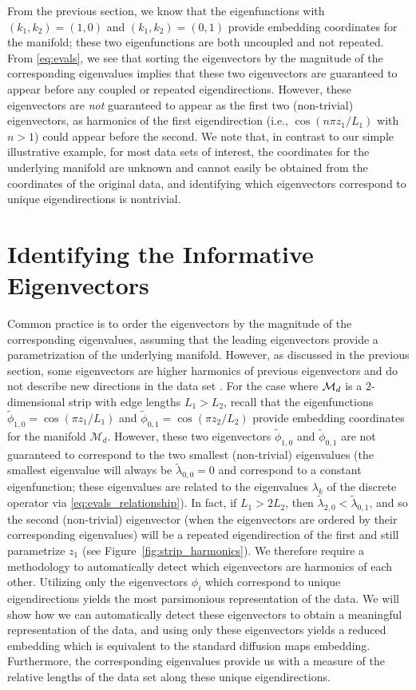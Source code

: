 From the previous section, we know that the eigenfunctions with $(k_1, k_2) =(1, 0)$ and $(k_1, k_2) =(0, 1)$ provide embedding coordinates for the manifold; these two eigenfunctions are both uncoupled and not repeated.
%
From \eqref{eq:evals}, we see that sorting the eigenvectors by the magnitude of the corresponding eigenvalues implies that these two eigenvectors are guaranteed to appear before any coupled or repeated eigendirections.
%
However, these eigenvectors are {\em not} guaranteed to appear as the first two (non-trivial) eigenvectors, as harmonics of the first eigendirection (i.e., $\cos \left( n \pi z_1 / L_1 \right)$ with $n > 1$) could appear before the second.
%
We note that, in contrast to our simple illustrative example, for most data sets of interest, the coordinates for the underlying manifold are unknown and cannot easily be obtained from the coordinates of the original data, and identifying which eigenvectors correspond to unique eigendirections is nontrivial.

\section{Identifying the Informative Eigenvectors }

Common practice is to order the eigenvectors by the magnitude of the corresponding eigenvalues, assuming that the leading eigenvectors provide a parametrization of the underlying manifold.
%
However, as discussed in the previous section, some eigenvectors are higher harmonics of previous eigenvectors and do not describe new directions in the data set \cite{gerber2007robust}.
%
For the case where $\mathcal{M}_d$ is a $2$-dimensional strip with edge lengths $L_1  > L_2$, recall that the eigenfunctions $\tilde{\phi}_{1,0} = \cos \left(  {\pi z_1}/{L_1} \right)$ and  $\tilde{\phi}_{0,1} = \cos \left(  {\pi z_2}/{L_2} \right)$ provide embedding coordinates for the manifold $\mathcal{M}_d$.
%
However, these two eigenvectors $\tilde{\phi}_{1, 0}$ and $\tilde{\phi}_{0, 1}$ are not guaranteed to correspond to the two smallest (non-trivial) eigenvalues (the smallest eigenvalue will always be $\tilde{\lambda}_{0,0} = 0$ and correspond to a constant eigenfunction; these eigenvalues are related to the eigenvalues $\lambda_k$ of the discrete operator via \eqref{eq:evals_relationship}).
%
In fact, if $L_1 > 2 L_2$, then $\tilde{\lambda}_{2, 0} < \tilde{\lambda}_{0, 1}$, and so the second (non-trivial) eigenvector (when the eigenvectors are ordered by their corresponding eigenvalues) will be a repeated eigendirection of the first and still parametrize $z_1$ (see Figure~\ref{fig:strip_harmonics}).
%
We therefore require a methodology to automatically detect which eigenvectors are harmonics of each other.
%
Utilizing only the eigenvectors $\phi_i$ which correspond to unique eigendirections yields the most parsimonious representation of the data.
%
We will show how we can automatically detect these eigenvectors to obtain a meaningful representation of the data, and using only these eigenvectors yields a reduced embedding which is equivalent to the standard diffusion maps embedding.
%
Furthermore, the corresponding eigenvalues provide us with a measure of the relative lengths of the data set along these unique eigendirections.


